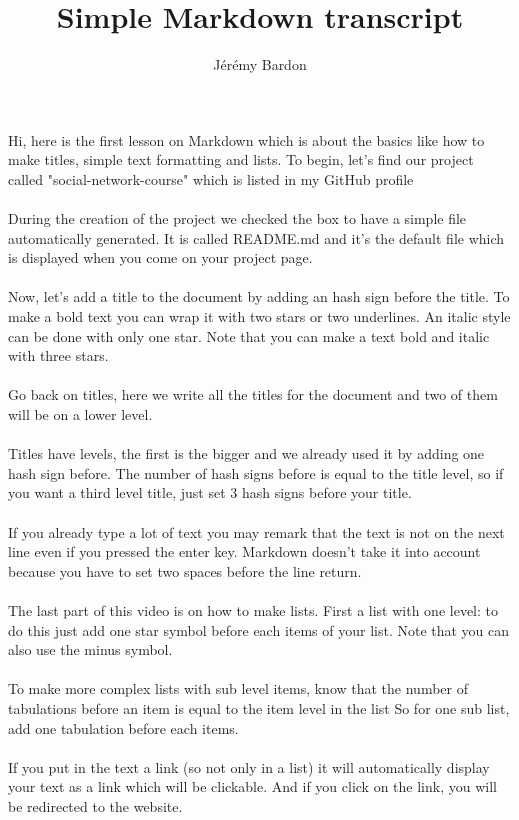 \documentclass{article}
\title{Simple Markdown transcript}
\author{Jérémy Bardon}
\date{}
\begin{document}
\maketitle

Hi, here is the first lesson on Markdown which is about the basics like how to make titles, simple text formatting and lists.
To begin, let's find our project called "social-network-course" which is listed in my GitHub profile
\\\\
During the creation of the project we checked the box to have a simple file automatically generated.
It is called README.md and it's the default file which is displayed when you come on your project page.
\\\\
Now, let's add a title to the document by adding an hash sign before the title.
To make a bold text you can wrap it with two stars or two underlines. An italic style can be done with
only one star. Note that you can make a text bold and italic with three stars.
\\\\
Go back on titles, here we write all the titles for the document
and two of them will be on a lower level.
\\\\
Titles have levels, the first is the bigger and we already used it by adding one hash sign before.
The number of hash signs before is equal to the title level, so if you want a third level title, just set
3 hash signs before your title.
\\\\
If you already type a lot of text you may remark that the text is not on the next line even if you pressed the enter key.
Markdown doesn't take it into account because you have to set two spaces before the line return.
\\\\
The last part of this video is on how to make lists.
First a list with one level: to do this just add one star symbol before each items of your list.
Note that you can also use the minus symbol.
\\\\
To make more complex lists with sub level items, know that the number of tabulations
before an item is equal to the item level in the list
So for one sub list, add one tabulation before each items.
\\\\
If you put in the text a link (so not only in a list) it will automatically display your text 
as a link which will be clickable. And if you click on the link, you will be redirected to the website.
\end{document}
